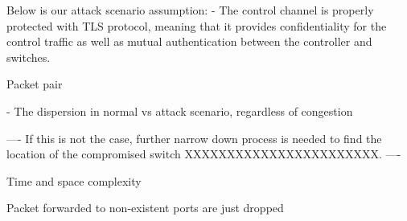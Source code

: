 Below is our attack scenario assumption: 
- The control channel is properly protected with TLS protocol, meaning
that it provides confidentiality for the control traffic as well as mutual
authentication between the controller and switches.

Packet pair

- The dispersion in normal vs attack scenario, regardless of congestion

----
If this is not the case, further narrow down process is needed to find the location of the compromised switch XXXXXXXXXXXXXXXXXXXXXXX.
----

Time and space complexity


Packet forwarded to non-existent ports are just dropped
